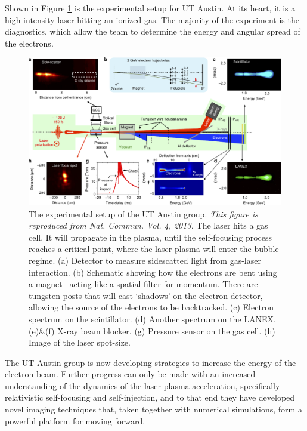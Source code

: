 \documentclass[12pt,letter]{article}
\begin{document}
Shown in Figure \ref{fig:experTexas} is the experimental setup for UT Austin. At
its heart, it is a high-intensity laser hitting an ionized gas. The
majority of the experiment is the diagnostics, which allow the team to determine
the energy and angular spread of the electrons.
\begin{figure}[h!]
	\includegraphics[width=\textwidth]{../figures/texasexplayout.pdf}
    \caption{\small The experimental setup of the UT Austin group.\cite{Wang2013}
        {\em This
        figure is reproduced from Nat. Commun. Vol. 4, 2013. } The laser hits
            a gas cell. It will propagate in the plasma, until the self-focusing
            process reaches a critical point, where the laser-plasma will enter
            the bubble regime. (a) Detector to measure sidescatted light
            from gas-laser interaction. (b) Schematic showing how the
            electrons are bent using a magnet-- acting like a spatial filter for
            momentum. There are tungsten posts that will cast `shadows' on the
            electron detector, allowing the source of the electrons to be
            backtracked. (c) Electron spectrum on the scintillator.
            (d) Another spectrum on the LANEX. (e)\&(f) X-ray beam
            blocker. (g) Pressure sensor on the gas cell. (h)
            Image of the laser spot-size.
        \label{fig:experTexas} }
    
\end{figure}

The UT Austin group is now developing strategies to increase the
energy of the electron beam. Further progress can only be made with an increased
understanding of the dynamics of the laser-plasma acceleration, specifically
relativistic self-focusing and self-injection, and to that end
they have developed novel imaging techniques that,
taken together with numerical simulations, form a powerful platform for moving
forward.\cite{dong2010laboratory,li2014single}
\end{document}
